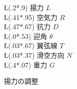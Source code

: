 \documentclass[a4j,11pt,papersize]{jsarticle}
\begin{document}
\begin{figure}[htbp]
 \begin{center}
  \SetLabels 
  \T\L(.2*.9) 揚力 $L$\\
  \T\L(.41*.95) 空気力 $R$\\
  \T\L(.47*.67) 抗力 $D$\\
  \T\L(.0*.53) 迎角 $\theta$\\
  \T\L(.03*.67) 翼弦線 $T$\\
  \T\L(.03*.37) 滑空方向 $N$\\
  \T\L(.4*.07) 重力 $G$\\
  \endSetLabels
  \ifdraft
    \ShowGrid
  \fi
  \strut{}%
  \caption{揚力の調整\label{fig:you}}%
 \end{center} 
\end{figure}
\end{document}
